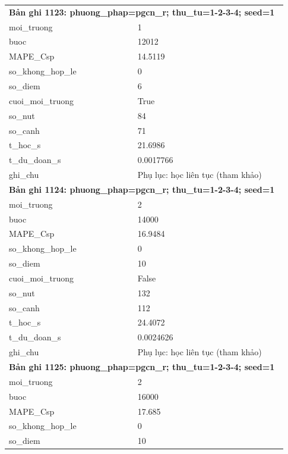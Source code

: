 \begin{longtable}{p{0.43\linewidth}p{0.50\linewidth}}
\midrule
\multicolumn{2}{p{0.95\linewidth}}{\textbf{Bản ghi 1123: phuong\_phap=pgcn\_r; thu\_tu=1-2-3-4; seed=1}} \\
moi\_\allowbreak truong & 1 \\
buoc & 12012 \\
MAPE\_\allowbreak Csp & 14.5119 \\
so\_\allowbreak khong\_\allowbreak hop\_\allowbreak le & 0 \\
so\_\allowbreak diem & 6 \\
cuoi\_\allowbreak moi\_\allowbreak truong & True \\
so\_\allowbreak nut & 84 \\
so\_\allowbreak canh & 71 \\
t\_\allowbreak hoc\_\allowbreak s & 21.6986 \\
t\_\allowbreak du\_\allowbreak doan\_\allowbreak s & 0.0017766 \\
ghi\_\allowbreak chu & Phụ lục: học liên tục (tham khảo) \\
\midrule
\multicolumn{2}{p{0.95\linewidth}}{\textbf{Bản ghi 1124: phuong\_phap=pgcn\_r; thu\_tu=1-2-3-4; seed=1}} \\
moi\_\allowbreak truong & 2 \\
buoc & 14000 \\
MAPE\_\allowbreak Csp & 16.9484 \\
so\_\allowbreak khong\_\allowbreak hop\_\allowbreak le & 0 \\
so\_\allowbreak diem & 10 \\
cuoi\_\allowbreak moi\_\allowbreak truong & False \\
so\_\allowbreak nut & 132 \\
so\_\allowbreak canh & 112 \\
t\_\allowbreak hoc\_\allowbreak s & 24.4072 \\
t\_\allowbreak du\_\allowbreak doan\_\allowbreak s & 0.0024626 \\
ghi\_\allowbreak chu & Phụ lục: học liên tục (tham khảo) \\
\midrule
\multicolumn{2}{p{0.95\linewidth}}{\textbf{Bản ghi 1125: phuong\_phap=pgcn\_r; thu\_tu=1-2-3-4; seed=1}} \\
moi\_\allowbreak truong & 2 \\
buoc & 16000 \\
MAPE\_\allowbreak Csp & 17.685 \\
so\_\allowbreak khong\_\allowbreak hop\_\allowbreak le & 0 \\
so\_\allowbreak diem & 10 \\

\end{longtable}
